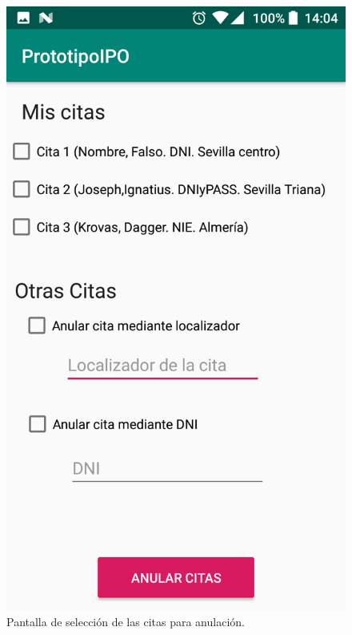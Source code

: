 \documentclass[a4paper,11pt]{article}
\begin{document}
\begin{figure}[H]
\centering
\begin{minipage}{0.45\linewidth}
\includegraphics[width=\textwidth]{2.png}
\caption{Pantalla de selección de las citas para anulación.}
\label{fig:anula1}
\end{minipage}
\begin{minipage}{0.45\linewidth}

\end{minipage}
\end{figure}
\end{document}
